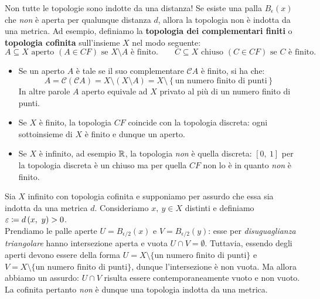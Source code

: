 \begin{attention}
	Non tutte le topologie sono indotte da una distanza! Se esiste una palla $B_\epsilon\left(x\right)$ che \textit{non} è aperta per qualunque distanza $d$, allora la topologia non è indotta da una metrica. Ad esempio, definiamo la \textbf{topologia dei complementari finiti} o \textbf{topologia cofinita} sull'insieme $X$ nel modo seguente:
	\begin{equation*}
		A\subseteq X \text{ aperto } \left(A\in CF\right) \text{ se }  X\setminus A \text{ è finito.}\qquad
		C\subseteq X \text{ chiuso } \left(C\in CF\right) \text{ se }  C \text{ è finito.}
	\end{equation*}
	\begin{itemize}
		\item Se un aperto $A$ è tale se il suo complementare $\mathcal{C}A$ è finito, si ha che:
		\begin{equation}
			A=\mathcal{C}\left(\mathcal{C}A\right)=X\setminus\left(X\setminus A\right)=X\setminus\left\{\text{un numero finito di punti}\right\}
		\end{equation}
		In altre parole $A$ aperto equivale ad $X$ privato al più di un numero finito di punti.
		\item Se $X$ è finito, la topologia $CF$ coincide con la topologia discreta: ogni sottoinsieme di $X$ è finito e dunque un aperto.
		\item Se $X$ è infinito, ad esempio $\mathbb{R}$, la topologia \textit{non} è quella discreta: $[0,\ 1]$ per la topologia discreta è un chiuso ma per quella $CF$ non lo è in quanto \textit{non} è finito.
	\end{itemize}
Sia $X$ infinito con topologia cofinita e supponiamo per assurdo che essa sia indotta da una metrica $d$. Consideriamo $x,\ y\in X$ distinti e definiamo $\varepsilon \coloneqq d\left(x,\ y\right) >0$.\\
Prendiamo le palle aperte $U=B_{\epsilon/2}\left(x\right)$ e $V=B_{\epsilon/2}\left(y\right)$: esse per \textit{disuguaglianza triangolare} hanno intersezione aperta e vuota $U\cap V=\emptyset$. Tuttavia, essendo degli aperti devono essere della forma $U=X\setminus \{\text{un numero finito di punti}\}$ e $V=X\setminus \{\text{un numero finito di punti}\}$, dunque l'intersezione è non vuota. Ma allora abbiamo un assurdo: $U\cap V$ risulta essere contemporaneamente vuoto e non vuoto. La cofinita pertanto \textit{non} è dunque una topologia indotta da una metrica.
\end{attention}
